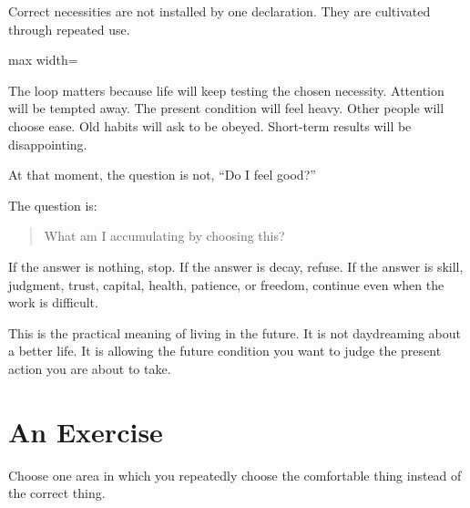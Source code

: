 Correct necessities are not installed by one declaration. They are cultivated through repeated use.

\begin{center}
\begin{adjustbox}{max width=\linewidth}
\end{adjustbox}
\end{center}

The loop matters because life will keep testing the chosen necessity. Attention will be tempted away. The present condition will feel heavy. Other people will choose ease. Old habits will ask to be obeyed. Short-term results will be disappointing.

At that moment, the question is not, ``Do I feel good?''

The question is:

\begin{quote}
What am I accumulating by choosing this?
\end{quote}

If the answer is nothing, stop. If the answer is decay, refuse. If the answer is skill, judgment, trust, capital, health, patience, or freedom, continue even when the work is difficult.

This is the practical meaning of living in the future. It is not daydreaming about a better life. It is allowing the future condition you want to judge the present action you are about to take.

\section*{An Exercise}

Choose one area in which you repeatedly choose the comfortable thing instead of the correct thing.

